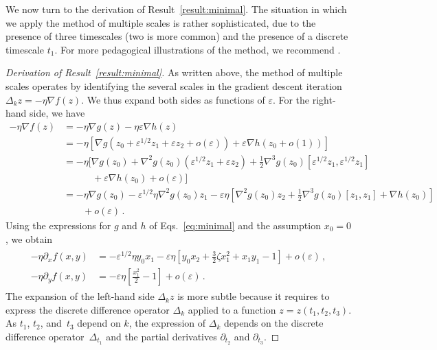 \documentclass[11pt,english,reqno]{article}
\theoremstyle{plain}
\theoremstyle{definition}
\theoremstyle{remark}
\numberwithin{equation}{section}
\begin{document}
We now turn to the derivation of Result~\ref{result:minimal}. The situation in which we apply the method of multiple scales is rather sophisticated, due to the presence of three timescales (two is more common) and the presence of a discrete timescale $t_1$. For more pedagogical illustrations of the method, we recommend \cite{holmes2012introduction}.

\begin{proof}[Derivation of Result~\ref{result:minimal}]
As written above, the method of multiple scales operates by identifying the several scales in the gradient descent iteration $\Delta_k z = - \eta \nabla f(z)$. We thus expand both sides as functions of $\varepsilon$. For the right-hand side, we have
\begin{align}
    -\eta \nabla f(z) &= -\eta \nabla g(z) - \eta \varepsilon \nabla h(z) \nonumber\\
    &= -\eta \left[\nabla g\left(z_0 + \varepsilon^{1/2} z_1 + \varepsilon z_2 + o(\varepsilon)\right) + \varepsilon \nabla h\left(z_0 + o(1)\right) \right] \nonumber\\
    &= -\eta \bigg[\nabla g(z_0) + \nabla^2 g(z_0) \left(\varepsilon^{1/2} z_1 + \varepsilon z_2\right) + \frac{1}{2} \nabla^3 g(z_0) \left[\varepsilon^{1/2} z_1 , \varepsilon^{1/2} z_1 \right] \nonumber\\
    &\qquad\quad+ \varepsilon \nabla h (z_0) + o (\varepsilon) 
    \bigg] \nonumber\\
    &= -\eta \nabla g(z_0) -  \varepsilon^{1/2} \eta \nabla^2 g(z_0) z_1 - \varepsilon\eta \left[\nabla^2 g(z_0) z_2 + \frac{1}{2} \nabla^3 g(z_0) [z_1, z_1] + \nabla h(z_0)\right] \nonumber\\
    &\qquad
    + o(\varepsilon) \label{eq:rhs-general}\, .
\end{align}
Using the expressions for $g$ and $h$ of Eqs.~\eqref{eq:minimal} and the assumption $x_0 = 0$, we obtain 
\begin{align}
    \label{eq:rhs-minimal}
    \begin{split}
    -\eta \partial_x f(x,y) &= - \varepsilon^{1/2} \eta y_0 x_1 - \varepsilon \eta \left[y_0 x_2 + \frac{3}{2} \zeta x_1^2 +  x_1 y_1 - 1\right] + o(\varepsilon) \, , \\
    -\eta \partial_y f(x,y) &= - \varepsilon \eta \left[\frac{x_1^2}{2} - 1\right] + o(\varepsilon) \, .
    \end{split}
\end{align}
The expansion of the left-hand side $\Delta_k z$ is more subtle because it requires to express the discrete difference operator $\Delta_k$ applied to a function $z = z(t_1, t_2, t_3)$. As $t_1$, $t_2$, and~$t_3$ depend on $k$, the expression of $\Delta_k$ depends on the discrete difference operator~$\Delta_{t_1}$ and the partial derivatives $\partial_{t_2}$ and $\partial_{t_3}$.

\end{proof}
\end{document}

